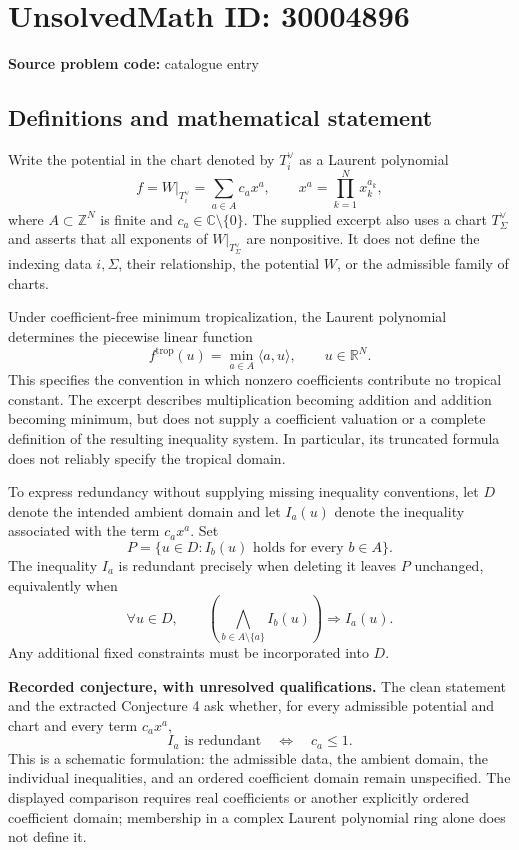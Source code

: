\documentclass[11pt]{article}
\newcommand{\Z}{\mathbb{Z}}
\newcommand{\R}{\mathbb{R}}
\newcommand{\C}{\mathbb{C}}
\begin{document}
\section*{UnsolvedMath ID: 30004896}
\textbf{Source problem code:} catalogue entry
\subsection{Definitions and mathematical statement}
Write the potential in the chart denoted by \(T_i^\vee\) as a Laurent polynomial
\[
f=W|_{T_i^\vee}=\sum_{a\in A}c_a x^a,
\qquad x^a=\prod_{k=1}^{N}x_k^{a_k},
\]
where \(A\subset\Z^N\) is finite and \(c_a\in\C\setminus\{0\}\). The supplied excerpt also uses a chart \(T_\Sigma^\vee\) and asserts that all exponents of \(W|_{T_\Sigma^\vee}\) are nonpositive. It does not define the indexing data \(i,\Sigma\), their relationship, the potential \(W\), or the admissible family of charts.

Under coefficient-free minimum tropicalization, the Laurent polynomial determines the piecewise linear function
\[
f^{\mathrm{trop}}(u)=\min_{a\in A}\langle a,u\rangle,
\qquad u\in\R^N.
\]
This specifies the convention in which nonzero coefficients contribute no tropical constant. The excerpt describes multiplication becoming addition and addition becoming minimum, but does not supply a coefficient valuation or a complete definition of the resulting inequality system. In particular, its truncated formula does not reliably specify the tropical domain.

To express redundancy without supplying missing inequality conventions, let \(D\) denote the intended ambient domain and let \(I_a(u)\) denote the inequality associated with the term \(c_ax^a\). Set
\[
P=\{u\in D:I_b(u)\text{ holds for every }b\in A\}.
\]
The inequality \(I_a\) is redundant precisely when deleting it leaves \(P\) unchanged, equivalently when
\[
\forall u\in D,\qquad
\left(\bigwedge_{b\in A\setminus\{a\}}I_b(u)\right)
\Longrightarrow I_a(u).
\]
Any additional fixed constraints must be incorporated into \(D\).

\textbf{Recorded conjecture, with unresolved qualifications.} The clean statement and the extracted Conjecture 4 ask whether, for every admissible potential and chart and every term \(c_ax^a\),
\[
I_a\text{ is redundant}\quad\Longleftrightarrow\quad c_a\leq 1.
\]
This is a schematic formulation: the admissible data, the ambient domain, the individual inequalities, and an ordered coefficient domain remain unspecified. The displayed comparison requires real coefficients or another explicitly ordered coefficient domain; membership in a complex Laurent polynomial ring alone does not define it.
\end{document}
